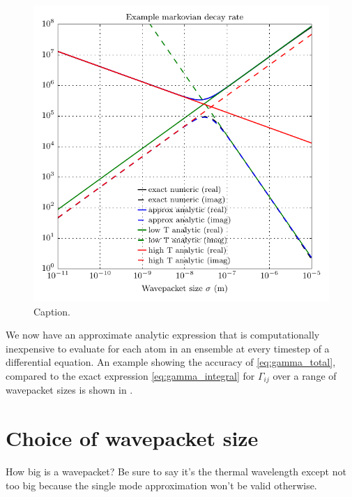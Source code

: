 \begin{figure}[t]
    \centerfloat
    \includegraphics{figures/hidden_variables/decoherence_rate_example.pdf}
    \caption{Caption.}\label{fig:decoherence_rate_example}
\end{figure}

We now have an approximate analytic expression that is computationally inexpensive to evaluate for each atom in an ensemble at every timestep of a differential equation.
An example showing the accuracy of \eqref{eq:gamma_total}, compared to the exact expression \eqref{eq:gamma_integral} for $\Gamma_{ij}$ over a range of wavepacket sizes is shown in .

\section{Choice of wavepacket size}

How big is a wavepacket? Be sure to say it's the thermal wavelength except not too big because the single mode approximation won't be valid otherwise. 
